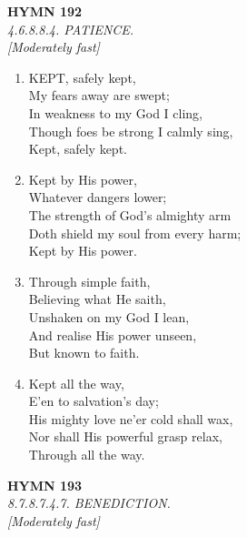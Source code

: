 \newpage
\begin{center}
    {\Large \textbf{HYMN 192}}
    \\
    \textit{4.6.8.8.4. PATIENCE.}
    \\
    \textit{\small [Moderately fast]}
\end{center}
\vspace{1em}

\begin{enumerate}
    \item KEPT, safely kept, \\
        My fears away are swept; \\
        In weakness to my God I cling, \\
        Though foes be strong I calmly sing, \\
        Kept, safely kept.

    \item Kept by His power, \\
        Whatever dangers lower; \\
        The strength of God's almighty arm \\
        Doth shield my soul from every harm; \\
        Kept by His power.

    \item Through simple faith, \\
        Believing what He saith, \\
        Unshaken on my God I lean, \\
        And realise His power unseen, \\
        But known to faith.

    \item Kept all the way, \\
        E'en to salvation's day; \\
        His mighty love ne'er cold shall wax, \\
        Nor shall His powerful grasp relax, \\
        Through all the way.

\end{enumerate}

\newpage
\begin{center}
    {\Large \textbf{HYMN 193}}
    \\
    \textit{8.7.8.7.4.7. BENEDICTION.}
    \\
    \textit{\small [Moderately fast]}
\end{center}
\vspace{1em}

